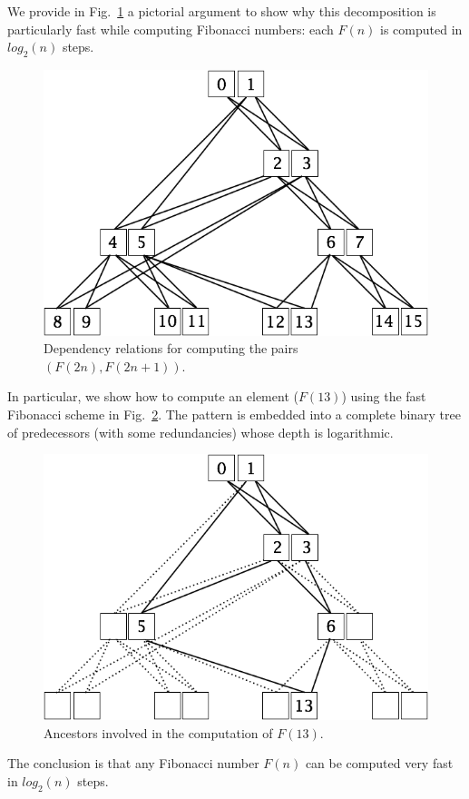 We provide in Fig.~\ref{fig:fastFibo} a pictorial argument to show why this decomposition 
is particularly fast while computing Fibonacci numbers:
each $F(n)$ is computed in $log_2 (n)$ steps.
\begin{figure}[h]
\begin{center}
        \includegraphics[scale=0.4]{FiguresMaths/FiboFast.png}
        \caption{Dependency relations for computing the pairs $(F(2n),F(2n+1))$.}
                \label{fig:fastFibo}
\end{center}
\end{figure}
In particular, we show how to compute an element ($F(13)$) using the fast Fibonacci scheme in Fig.~\ref{fig:fastFibo13}.
The pattern is embedded into a complete binary tree of predecessors (with some redundancies)
whose depth is logarithmic.
\begin{figure}[h]
\begin{center}
        \includegraphics[scale=0.4]{FiguresMaths/FiboFast13.png}
        \caption{Ancestors involved in the computation of $F(13)$. }
        \label{fig:fastFibo13}
\end{center}
\end{figure}
The conclusion is that
any Fibonacci number $F(n)$ can be computed very fast in $log_2 (n)$ steps.



